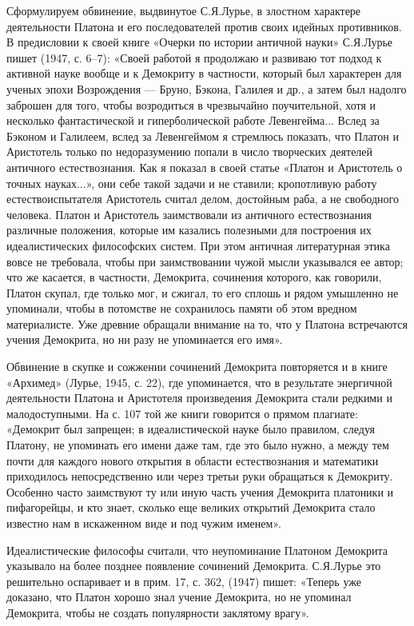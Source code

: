 Сформулируем  обвинение, выдвинутое  С.Я.Лурье,  в злостном  характере
деятельности  Платона  и  его   последователей  против  своих  идейных
противников. В предисловии  к своей книге «Очерки  по истории античной
науки» С.Я.Лурье  пишет (1947,  с. 6--7):  «Своей работой  я продолжаю
и  развиваю  тот подход  к  активной  науке  вообще  и к  Демокриту  в
частности,  который был  характерен для  ученых эпохи  Возрождения ---
Бруно,  Бэкона,  Галилея и  др.,  а  затем  был надолго  заброшен  для
того, чтобы  возродиться в чрезвычайно поучительной,  хотя и несколько
фантастической и гиперболической работе Левенгейма... Вслед за Бэконом
и  Галилеем, вслед  за Левенгеймом  я стремлюсь  показать, что  Платон
и  Аристотель  только  по  недоразумению  попали  в  число  творческих
деятелей  античного  естествознания.  Как  я показал  в  своей  статье
«Платон  и Аристотель  о точных  науках...», они  себе такой  задачи и
не  ставили; кропотливую  работу естествоиспытателя  Аристотель считал
делом, достойным раба,  а не свободного человека.  Платон и Аристотель
заимствовали из античного  естествознания различные положения, которые
им казались  полезными для  построения их  идеалистических философских
систем. При этом античная литературная этика вовсе не требовала, чтобы
при заимствовании чужой мысли указывался  ее автор; что же касается, в
частности, Демокрита, сочинения которого, как говорили, Платон скупал,
где  только  мог,  и  сжигал,  то его  сплошь  и  рядом  умышленно  не
упоминали, чтобы  в потомстве  не сохранилось  памяти об  этом вредном
материалисте.  Уже древние  обращали  внимание на  то,  что у  Платона
встречаются учения Демокрита, но ни разу не упоминается его имя».

Обвинение  в  скупке  и  сожжении сочинений  Демокрита  повторяется  и
в  книге  «Архимед» (Лурье,  1945,  с.  22),  где упоминается,  что  в
результате энергичной  деятельности Платона и  Аристотеля произведения
Демокрита  стали редкими  и малодоступными.  На  с. 107  той же  книги
говорится о прямом плагиате: «Демокрит был запрещен; в идеалистической
науке было правилом, следуя Платону,  не упоминать его имени даже там,
где это  было нужно, а между  тем почти для каждого  нового открытия в
области  естествознания и  математики приходилось  непосредственно или
через третьи руки обращаться к Демокриту. Особенно часто заимствуют ту
или иную часть учения Демокрита  платоники и пифагорейцы, и кто знает,
сколько еще великих открытий Демокрита стало известно нам в искаженном
виде и под чужим именем».

Идеалистические философы считали,  что неупоминание Платоном Демокрита
указывало на  более позднее  появление сочинений  Демокрита. С.Я.Лурье
это решительно оспаривает и в прим.  17, с. 362, (1947) пишет: «Теперь
уже доказано, что Платон хорошо  знал учение Демокрита, но не упоминал
Демокрита, чтобы не создать популярности заклятому врагу».

